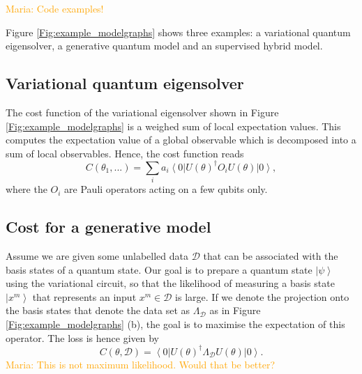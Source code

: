 \documentclass[aps,pra,10pt,twocolumn,groupedaddress,nofootinbib]{revtex4-1}
\theoremstyle{plain}
\newcommand{\ket}[1]{\ensuremath{\left| #1 \right \rangle}}
\newcommand{\bra}[1]{\ensuremath{\left \langle #1 \right |}}
\newcommand{\maria}[1]{\textcolor{orange}{Maria: #1}}
\begin{document}
\begin{figure*}[t]
\begin{flushleft}
\end{flushleft}
\caption{Examples of model graphs. Turqois nodes depict quantum nodes, and orange nodes depict classical nodes. (a) Model graph of a variational quantum eigensolver, in which expectation values of local Pauli operators are combined by a classical layer to an expectation value of a global Hamiltonian. (b)  A model, here a generative model) can even have different architectures for training and data generation. While the model is trained maximising the expectation of a quantum operator $\Lambda_{\mathcal{D}}$ that projects onto a `training set subspace' of Hilbert space, it can be used to sample data by performing a single computational basis measurement (i.e., $R=1$). (c) Model graph of a classical neural network with a final quantum layer that computes the scalar output.}
\label{Fig:example_modelgraphs}
\end{figure*}

\maria{Code examples!}

Figure \ref{Fig:example_modelgraphs} shows three examples: a variational quantum eigensolver, a generative quantum model and an supervised hybrid model. \\

\subsection{Variational quantum eigensolver}

The cost function of the variational eigensolver shown in Figure \ref{Fig:example_modelgraphs} is a weighed sum of local expectation values. This computes the expectation value of a global observable which is decomposed into a sum of local observables. Hence, the cost function reads
\[ C(\theta_1,...) = \sum_i a_i \bra{0}U(\theta)^{\dagger} O_i U(\theta)\ket{0}, \]
where the $O_i$ are Pauli operators acting on a few qubits only.


\subsection{Cost for a generative model}
Assume we are given some unlabelled data $\mathcal{D}$ that can be associated with the basis states of a quantum state. Our goal is to prepare a quantum state $\ket{\psi}$ using the variational circuit, so that the likelihood of measuring a basis state $\ket{x^m}$ that represents an input $x^m \in \mathcal{D}$ is large. If we denote the projection onto the basis states that denote the data set as $\Lambda_{\mathcal{D}}$ as in Figure \ref{Fig:example_modelgraphs} (b), the goal is to maximise the expectation of this operator. The loss is hence given by
\[ C(\theta, \mathcal{D}) = \bra{0}U(\theta)^{\dagger} \Lambda_{\mathcal{D}} U(\theta)\ket{0}.\]
\maria{This is not maximum likelihood. Would that be better?}
\end{document}
